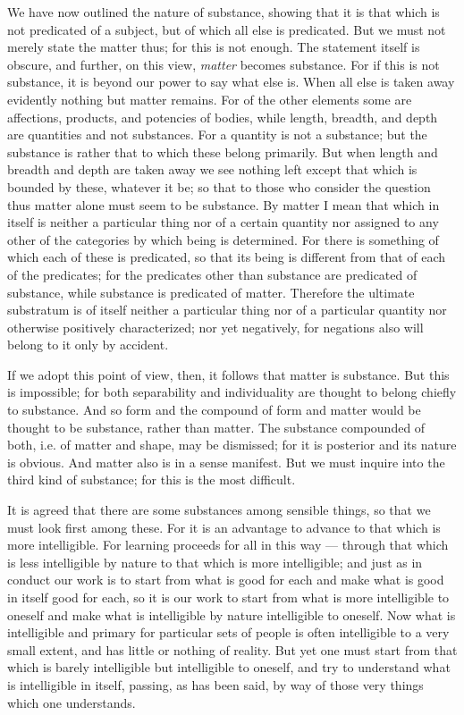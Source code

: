 We have now outlined the nature of substance, showing that it is that which is not predicated of a subject, but of which all else is predicated. But we must not merely state the matter thus; for this is not enough. The statement itself is obscure, and further, on this view, \emph{matter} becomes substance. For if this is not substance, it is beyond our power to say what else is. When all else is taken away evidently nothing but matter remains. For of the other elements some are affections, products, and potencies of bodies, while length, breadth, and depth are quantities and not substances. For a quantity is not a substance; but the substance is rather that to which these belong primarily. But when length and breadth and depth are taken away we see nothing left except that which is bounded by these, whatever it be; so that to those who consider the question thus matter alone must seem to be substance. By matter I mean that which in itself is neither a particular thing nor of a certain quantity nor assigned to any other of the categories by which being is determined. For there is something of which each of these is predicated, so that its being is different from that of each of the predicates; for the predicates other than substance are predicated of substance, while substance is predicated of matter. Therefore the ultimate substratum is of itself neither a particular thing nor of a particular quantity nor otherwise positively characterized; nor yet negatively, for negations also will belong to it only by accident.

If we adopt this point of view, then, it follows that matter
is substance. But this is impossible; for both separability
and individuality are thought to belong chiefly to substance.
And so form and the compound of form and matter would be
thought to be substance, rather than matter. The substance
compounded of both, i.e. of matter and shape, may be dismissed; for it is posterior and its nature is obvious. And
matter also is in a sense manifest. But we must inquire into
the third kind of substance; for this is the most difficult.

It is agreed that there are some substances among sensible
things, so that we must look first among these. For it is an advantage to advance to that which is more intelligible. For
learning proceeds for all in this way — through that which is
less intelligible by nature to that which is more intelligible; and just as in conduct our work is to start from what is good for each and make what is good in itself good for each, so it is our work to start from what is more intelligible to oneself and make what is intelligible by nature intelligible to oneself. Now what is intelligible and primary for particular sets of people is often intelligible to a very small extent, and has little or nothing of reality. But yet one must start from that which is barely intelligible but intelligible to oneself, and try to understand what is intelligible in itself, passing, as has been said, by way of those very things which one understands.

